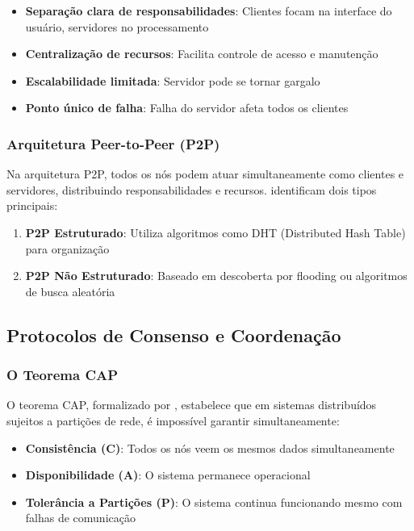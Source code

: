 \begin{itemize}
    \item \textbf{Separação clara de responsabilidades}: Clientes focam na interface do usuário, servidores no processamento
    \item \textbf{Centralização de recursos}: Facilita controle de acesso e manutenção
    \item \textbf{Escalabilidade limitada}: Servidor pode se tornar gargalo
    \item \textbf{Ponto único de falha}: Falha do servidor afeta todos os clientes
\end{itemize}

\subsubsection{Arquitetura Peer-to-Peer (P2P)}

Na arquitetura P2P, todos os nós podem atuar simultaneamente como clientes e servidores, distribuindo responsabilidades e recursos.  identificam dois tipos principais:

\begin{enumerate}
    \item \textbf{P2P Estruturado}: Utiliza algoritmos como DHT (Distributed Hash Table) para organização
    \item \textbf{P2P Não Estruturado}: Baseado em descoberta por flooding ou algoritmos de busca aleatória
\end{enumerate}

\subsection{Protocolos de Consenso e Coordenação}

\subsubsection{O Teorema CAP}

O teorema CAP, formalizado por , estabelece que em sistemas distribuídos sujeitos a partições de rede, é impossível garantir simultaneamente:

\begin{itemize}
    \item \textbf{Consistência (C)}: Todos os nós veem os mesmos dados simultaneamente
    \item \textbf{Disponibilidade (A)}: O sistema permanece operacional
    \item \textbf{Tolerância a Partições (P)}: O sistema continua funcionando mesmo com falhas de comunicação
\end{itemize}

